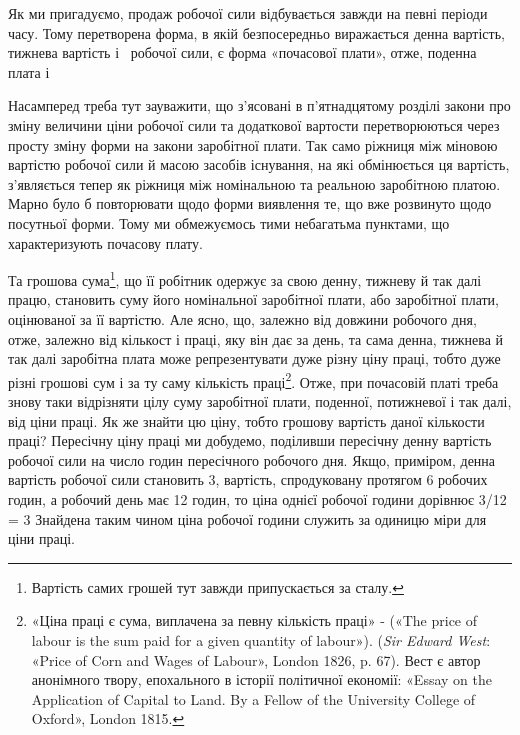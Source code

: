Як ми пригадуємо, продаж робочої сили відбувається завжди
на певні періоди часу. Тому перетворена форма, в якій безпосередньо
виражається денна вартість, тижнева вартість і~ робочої
сили, є форма «почасової плати», отже, поденна плата і~

Насамперед треба тут зауважити, що з’ясовані в п’ятнадцятому
розділі закони про зміну величини ціни робочої сили та додаткової
вартости перетворюються через просту зміну форми
на закони заробітної плати. Так само ріжниця між міновою вартістю
робочої сили й масою засобів існування, на які обмінюється
ця вартість, з’являється тепер як ріжниця між номінальною та
реальною заробітною платою. Марно було б повторювати щодо
форми виявлення те, що вже розвинуто щодо посутньої форми.
Тому ми обмежуємось тими небагатьма пунктами, що характеризують
почасову плату.

Та грошова сума\footnote{
Вартість самих грошей тут завжди припускається за сталу.
}, що її робітник одержує за свою денну,
тижневу й так далі працю, становить суму його номінальної
заробітної плати, або заробітної плати, оцінюваної за її вартістю.
Але ясно, що, залежно від довжини робочого дня, отже,
залежно від кількост і праці, яку він дає за день, та сама денна,
тижнева й так далі заробітна плата може репрезентувати дуже
різну ціну праці, тобто дуже різні грошові сум і за ту саму кількість
праці\footnote{
«Ціна праці є сума, виплачена за певну кількість праці» - («The
price of labour is the sum paid for a given quantity of labour»).
(\emph{Sir Edward West}: «Price of Corn and Wages of Labour», London 1826,
p. 67). Вест є автор анонімного твору, епохального в історії політичної економії:
«Essay on the Application of Capital to Land. By a Fellow of the
University College of Oxford», London 1815.
}. Отже, при почасовій платі треба знову таки відрізняти
цілу суму заробітної плати, поденної, потижневої і так
далі, від ціни праці. Як же знайти цю ціну, тобто грошову вартість
даної кількости праці? Пересічну ціну праці ми добудемо,
поділивши пересічну денну вартість робочої сили на число годин
пересічного робочого дня. Якщо, приміром, денна вартість
робочої сили становить 3, вартість, спродуковану протягом
6 робочих годин, а робочий день має 12 годин, то ціна однієї
робочої години дорівнює 3/12 = 3 Знайдена
таким чином ціна робочої години служить за одиницю міри для
ціни праці.

